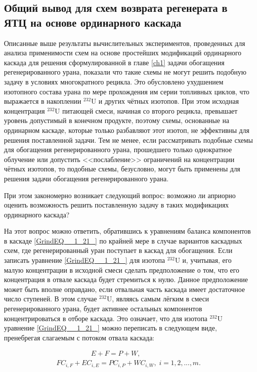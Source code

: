 \subsection{Общий вывод для схем возврата регенерата в ЯТЦ на основе ординарного каскада}

Описанные выше результаты вычислительных экспериментов, проведенных для анализа применимости схем на основе простейших модификаций ординарного каскада для решения сформулированной в главе \ref{ch1} задачи обогащения регенерированного урана, показали что такие схемы не могут решить подобную задачу в условиях  многократного рецикла. Это обусловлено ухудшением изотопного состава урана по мере прохождения им серии топливных циклов, что выражается в накоплении $^{232}$U и других чётных изотопов. При этом исходная концентрация $^{232}$U питающей смеси, начиная со второго рецикла, превышает уровень допустимый в конечном продукте, поэтому схемы, основанные на ординарном каскаде, которые только разбавляют этот изотоп, не эффективны для решения поставленной задачи. Тем не менее, если рассматривать подобные схемы для обогащения регенерированного урана, прошедшего только однократное облучение или допустить <<послабление>> ограничений на концентрации чётных изотопов, то подобные схемы, безусловно, могут быть применены для решения задачи обогащения регенерированного урана.

При этом закономерно возникает следующий вопрос: возможно ли априорно оценить возможность решить поставленную задачу в таких модификациях ординарного каскада? 

На этот вопрос можно ответить, обратившись к уравнениям баланса компонентов в каскаде \ref{GrindEQ__1_21_} по крайней мере в случае вариантов каскадных схем, где регенерированный уран поступает в каскад для обогащения. Если записать уравнение \ref{GrindEQ__1_21_} для изотопа $^{232}$U и, учитывая, его малую концентрации в исходной смеси сделать предположение о том, что его концентрация в отвале каскада будет стремиться к нулю. Данное предположение может быть вполне оправдано, если отвальная часть каскада имеет достаточное число ступеней. В этом случае $^{232}$U, являясь самым лёгким в смеси регенерированного урана, будет активнее остальных компонентов концентрироваться в отборе каскада. Это означает, что для изотопа $^{232}$U уравнение \ref{GrindEQ__1_21_} можно переписать в следующем виде, пренебрегая слагаемым с потоком отвала каскада:

\begin{equation} \label{GrindEQ__1_21__} 
  \begin{array}{l} {\quad \quad \quad \quad \quad  E+F=P+W,} \\ {FC_{i,F} + EC_{i,E} =PC_{i,P} +WC_{i,W} ,\;  i=1,2,...,m.} \end{array} 
\end{equation} 

